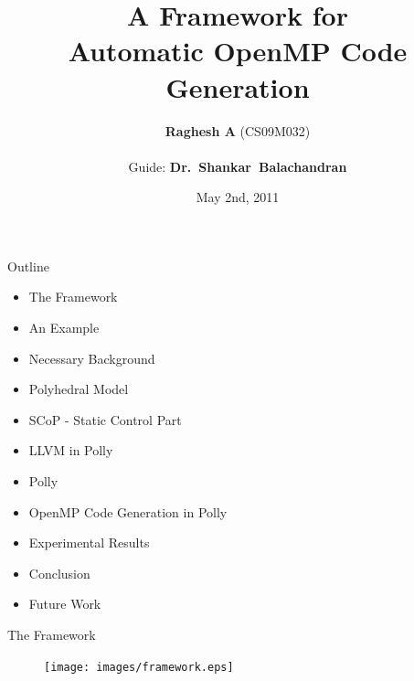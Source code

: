 \documentclass{beamer}
\title{A Framework for \\Automatic OpenMP Code Generation
 }
\author{\textbf{Raghesh A} (CS09M032)\\\ \\ Guide: \textbf{Dr.~Shankar~Balachandran}}
\date{May 2nd, 2011}
\begin{document}
\begin{frame}
\titlepage
\end{frame}

\begin{frame}{Outline}
\begin{itemize}
\item The Framework
\item An Example
\item Necessary Background
\item Polyhedral Model
\item SCoP - Static Control Part
\item LLVM in Polly
\item Polly
\item OpenMP Code Generation in Polly
\item Experimental Results
\item Conclusion 
\item Future Work
\end{itemize}
\end{frame}

\begin{frame}{The Framework}
\begin{figure}
\begin{center}
  \texttt{[image: images/framework.eps]}
\end{center}  
\end{figure}
\end{frame}
\end{document}
